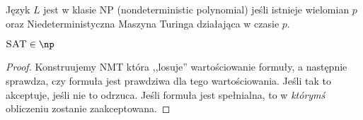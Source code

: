 \begin{definition}
    Język \( L \) jest w klasie NP (nondeterministic polynomial) jeśli istnieje wielomian \( p \) oraz Niedeterministyczna Maszyna Turinga działająca w czasie \( p \).
\end{definition}

\begin{theorem}
    \(\textsc{SAT} \in \np \)
\end{theorem}
\begin{proof}
    Konstruujemy NMT która ,,losuje'' wartościowanie formuły, a następnie sprawdza, czy formuła jest prawdziwa dla tego wartościowania. Jeśli tak to akceptuje, jeśli nie to odrzuca.
    Jeśli formuła jest spełnialna, to w \textit{którymś} obliczeniu zostanie zaakceptowana. 
\end{proof}